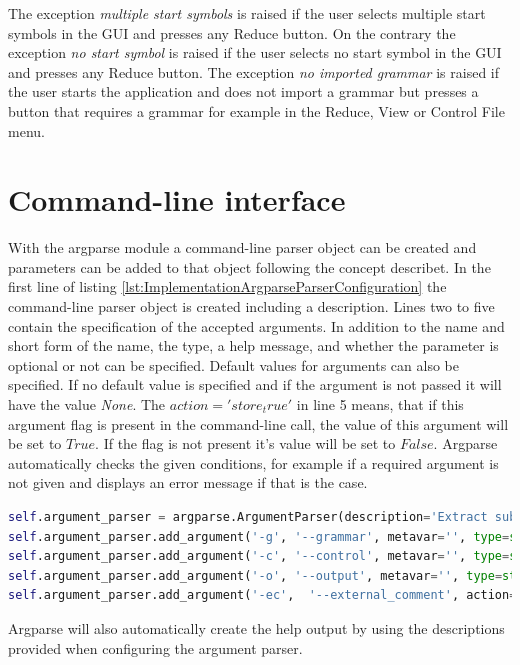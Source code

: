 The exception \textit{multiple start symbols} is raised if the user selects multiple start symbols in the GUI and presses any Reduce button. On the contrary the exception \textit{no start symbol} is raised if the user selects no start symbol in the GUI and presses any Reduce button. The exception \textit{no imported grammar} is raised if the user starts the application and does not import a grammar but presses a button that requires a grammar for example in the Reduce, View or Control File menu.

\section{Command-line interface}\label{sec:ImplementationCommandLineInterface}

With the argparse module a command-line parser object can be created and parameters can be added to that object following the concept describet.
In the first line of listing \ref{lst:ImplementationArgparseParserConfiguration} the command-line parser object is created including a description.
Lines two to five contain the specification of the accepted arguments.
In addition to the name and short form of the name, the type, a help message, and whether the parameter is optional or not can be specified.
Default values for arguments can also be specified.
If no default value is specified and if the argument is not passed it will have the value \textit{None}.
The $action = 'store_true'$ in line 5 means, that if this argument flag is present in the command-line call, the value of this argument will be set to $True$.
If the flag is not present it's value will be set to $False$.
Argparse automatically checks the given conditions, for example if a required argument is not given and displays an error message if that is the case.

\begin{lstlisting}[language=Python, basicstyle=\scriptsize	,caption= Argparse command-line parser configuration,label= lst:ImplementationArgparseParserConfiguration]
self.argument_parser = argparse.ArgumentParser(description='Extract sub-syntax using TPTP syntax file and a control file')
self.argument_parser.add_argument('-g', '--grammar', metavar='', type=str, required=True, help='path of the TPTP syntax file')
self.argument_parser.add_argument('-c', '--control', metavar='', type=str, required=True, help='path of the control file')
self.argument_parser.add_argument('-o', '--output', metavar='', type=str, required=False, help='optional output file name (default output.txt)', default= "output.txt")
self.argument_parser.add_argument('-ec',  '--external_comment', action='store_true', help="flag - include external comment syntax")
\end{lstlisting}

Argparse will also automatically create the help output by using the descriptions provided when configuring the argument parser.

